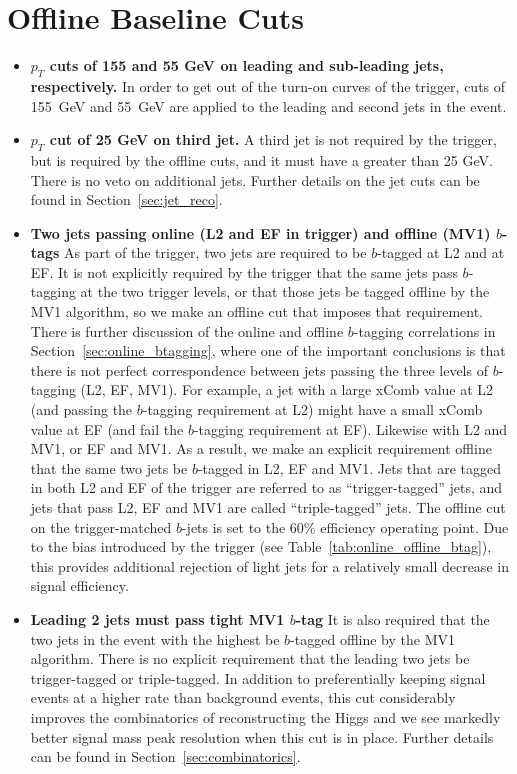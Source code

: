 \section{Offline Baseline Cuts}


\begin{itemize}
\item
\textbf{$p_T$ cuts of 155 and 55 GeV on leading and sub-leading jets, respectively.}
In order to get out of the \pt turn-on curves of the trigger, cuts of
155~GeV and 55~GeV are applied to the leading and second jets in the
event.
\item
\textbf{$p_T$ cut of 25 GeV on third jet.}
A third jet is not required by the trigger, but is required by
the offline cuts, and it must have a \pt greater than 25 GeV.  There is
no veto on additional jets.  Further details on the jet cuts can be found
in Section~\ref{sec:jet_reco}.
\item
\textbf{Two jets passing online (L2 and EF in trigger) and offline (MV1) $b$-tags}
As part of the trigger, two jets are required to be $b$-tagged at L2 and at EF.  It
is not explicitly required by the trigger that the same jets pass $b$-tagging at the two trigger levels,
or that those jets be tagged offline by the MV1 algorithm, so we make an
offline cut that imposes that requirement.  There is further discussion of the online
and offline $b$-tagging correlations in Section~\ref{sec:online_btagging},
where one of the important conclusions is that there is not perfect correspondence
between jets passing the three levels of $b$-tagging (L2, EF, MV1).  For
example, a jet with a large xComb value at L2 (and passing the $b$-tagging
requirement at L2) might have a small xComb value at EF (and fail the $b$-tagging
requirement at EF).  Likewise with L2 and MV1, or EF and MV1.  As a result, we
make an explicit requirement offline that the same two jets be $b$-tagged in L2, EF
and MV1.  Jets that are tagged in both L2 and EF of the trigger are referred to as
``trigger-tagged'' jets, and jets that pass L2, EF and MV1 are called ``triple-tagged''
jets.
The offline cut on the
trigger-matched $b$-jets is set to the 60\% efficiency
operating point. Due to the bias introduced by the trigger (see
Table~\ref{tab:online_offline_btag}), this provides additional rejection of
light jets for a relatively small decrease in signal efficiency.


\item\textbf{Leading 2 jets must pass tight MV1 $b$-tag}
It is also required that the two jets in the event with the highest \pt be $b$-tagged
offline by the MV1 algorithm.  There is no explicit requirement that the leading
two jets be trigger-tagged or triple-tagged.
  In addition to preferentially keeping signal events at a higher rate than
background events, this cut considerably improves the combinatorics of reconstructing
the Higgs and we see markedly better signal mass peak resolution when this cut is in
place.  Further details can be found in Section~\ref{sec:combinatorics}.



\end{itemize}
